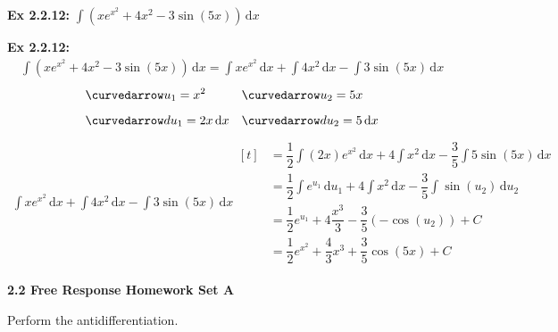 \begin{tcolorbox}[example]
    \textbf{Ex 2.2.12: } $\int \left(xe^{x^2} + 4x^2 - 3\sin (5x)\right) \,\mathrm{d}x$
\end{tcolorbox}
\begin{tcolorbox}[solution]
    \textbf{Ex 2.2.12: } \begin{align*}
        \int \left(xe^{x^2} + 4x^2 - 3\sin (5x)\right) \,\mathrm{d}x = \int xe^{x^2} \,\mathrm{d}x + \int 4x^2 \,\mathrm{d}x - \int 3\sin (5x) \,\mathrm{d}x
    \end{align*} \vspace{-11pt} \begin{align*}
        &\curvedarrow u_1 = x^2 && \curvedarrow u_2 = 5x \\[5.5pt]
        &\curvedarrow du_1 = 2x \,\mathrm{d}x && \curvedarrow du_2 = 5 \,\mathrm{d}x
    \end{align*} \vspace{-11pt} \begin{align*}
        \int xe^{x^2} \,\mathrm{d}x + \int 4x^2 \,\mathrm{d}x - \int 3\sin (5x) \,\mathrm{d}x \begin{aligned}[t]
            & = \dfrac{1}{2}\int (2x)e^{x^2} \,\mathrm{d}x + 4\int x^2 \,\mathrm{d}x - \dfrac{3}{5}\int 5\sin(5x) \,\mathrm{d}x \\[11pt]
            & = \dfrac{1}{2}\int e^{u_1} \,\mathrm{d}u_1 + 4\int x^2 \,\mathrm{d}x - \dfrac{3}{5}\int \sin \left(u_2\right) \,\mathrm{d}u_2 \\[11pt]
            & = \dfrac{1}{2}e^{u_1} + 4\dfrac{x^3}{3} - \dfrac{3}{5}(-\cos (u_2)) + C \\[11pt]
            & = \boxed{\dfrac{1}{2}e^{x^2} + \dfrac{4}{3}x^3 + \dfrac{3}{5}\cos (5x) + C}
        \end{aligned}
    \end{align*}
\end{tcolorbox} 

\newpage

\textbf{\large{2.2 Free Response Homework Set A}} \par

Perform the antidifferentiation. \par

